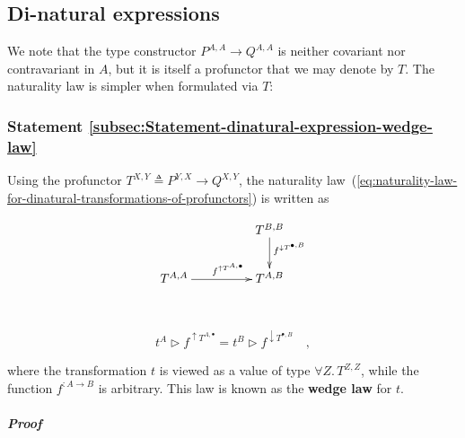 \subsection{Di-natural expressions}

We note that the type constructor $P^{A,A}\rightarrow Q^{A,A}$ is
neither covariant nor contravariant in $A$, but it is itself a profunctor
that we may denote by $T$. The naturality law is simpler when formulated
via $T$:

\subsubsection{Statement \label{subsec:Statement-dinatural-expression-wedge-law}\ref{subsec:Statement-dinatural-expression-wedge-law}}

Using the profunctor $T^{X,Y}\triangleq P^{Y,X}\rightarrow Q^{X,Y}$,
the naturality law~(\ref{eq:naturality-law-for-dinatural-transformations-of-profunctors})
is written as

\begin{wrapfigure}[9]{l}{0.3\columnwidth}%
\vspace{-1.2\baselineskip}
\[
\xymatrix{\xyScaleY{2.0pc}\xyScaleX{4.0pc} & T^{B,B}\ar[d]\sp(0.37){f^{\downarrow T^{\bullet,B}}}\\
T^{A,A}\ar[r]\sp(0.5){~~~f^{\uparrow T^{A,\bullet}}} & T^{A,B}
}
\]

\vspace{-0\baselineskip}
\end{wrapfigure}%

~\vspace{-0.8\baselineskip}

\begin{equation}
t^{A}\triangleright f^{\uparrow T^{A,\bullet}}=t^{B}\triangleright f^{\downarrow T^{\bullet,B}}\quad,\label{eq:dinaturality-wedge-law}
\end{equation}
\vspace{-0.8\baselineskip}

\noindent where the transformation $t$ is viewed as a value of type
$\forall Z.\,T^{Z,Z}$, while the function $f^{:A\rightarrow B}$
is arbitrary. This law is known as the \textbf{wedge law}
for $t$.

\subparagraph{Proof}

